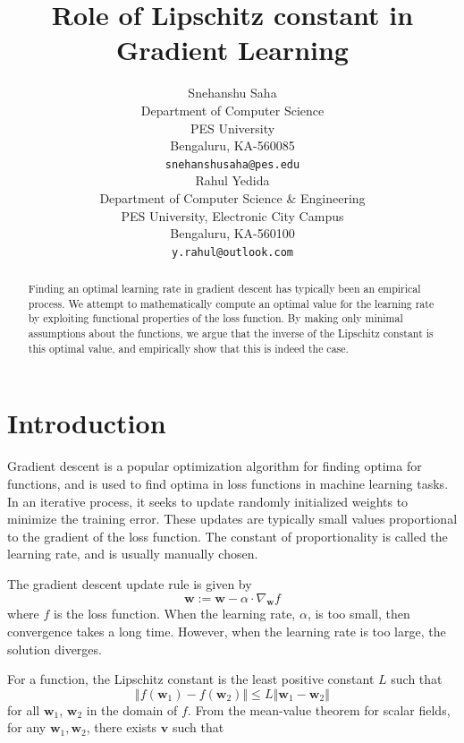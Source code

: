 \documentclass{article}
\title{Role of Lipschitz constant in Gradient Learning}
\author{
        Snehanshu Saha\\
        Department of Computer Science\\
        PES University\\
        Bengaluru, KA-560085\\
        \texttt{snehanshusaha@pes.edu}\\
        \And
        Rahul Yedida\\
        Department of Computer Science \& Engineering \\
        PES University, Electronic City Campus \\
        Bengaluru, KA-560100 \\
        \texttt{y.rahul@outlook.com}
    }
\begin{document}
\maketitle

\begin{abstract}
     Finding an optimal learning rate in gradient descent has typically been an empirical process. We attempt to mathematically compute an optimal value for the learning rate by exploiting functional properties of the loss function. By making only minimal assumptions about the functions, we argue that the inverse of the Lipschitz constant is this optimal value, and empirically show that this is indeed the case.
\end{abstract}

\section{Introduction}
Gradient descent is a popular optimization algorithm for finding optima for functions, and is used to find optima in loss functions in machine learning tasks. In an iterative process, it seeks to update randomly initialized weights to minimize the training error. These updates are typically small values proportional to the gradient of the loss function. The constant of proportionality is called the learning rate, and is usually manually chosen.

The gradient descent update rule is given by
\[
    \textbf{w} := \textbf{w} - \alpha \cdot \nabla_{\textbf{w}} f
\]
where $f$ is the loss function. When the learning rate, $\alpha$, is too small, then convergence takes a long time. However, when the learning rate is too large, the solution diverges. 

For a function, the Lipschitz constant is the least positive constant $L$ such that 
\[
    \left\Vert f(\textbf{w}_1) - f(\textbf{w}_2)\right\Vert \leq L \left\Vert \textbf{w}_1 - \textbf{w}_2 \right\Vert
\]
for all $\textbf{w}_1$, $\textbf{w}_2$ in the domain of $f$. From the mean-value theorem for scalar fields, for any $\textbf{w}_1, \textbf{w}_2$, there exists $\textbf{v}$ such that 
\end{document}
